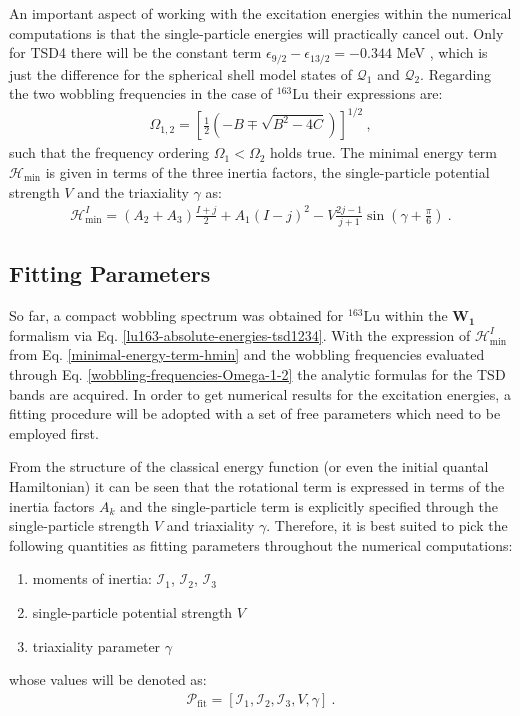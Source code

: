 An important aspect of working with the excitation energies within the numerical computations is that the single-particle energies will practically cancel out. Only for TSD4 there will be the constant term $\epsilon_{9/2}-\epsilon_{13/2}=-0.344$ MeV \cite{raduta2020towards}, which is just the difference for the spherical shell model states of $\mathcal{Q}_1$ and $\mathcal{Q}_2$. Regarding the two wobbling frequencies in the case of $^{163}$Lu their expressions are:
\begin{align}
    \Omega_{1,2}=\left[\frac{1}{2}\left(-B\mp\sqrt{B^2-4C}\right)\right]^{1/2}\ ,
    \label{wobbling-frequencies-Omega-1-2}
\end{align}
such that the frequency ordering $\Omega_1<\Omega_2$ holds true. The minimal energy term $\mathcal{H}_\text{min}$ is given in terms of the three inertia factors, the single-particle potential strength $V$ and the triaxiality $\gamma$ as:
\begin{align}
    \mathcal{H}_\text{min}^I=\left(A_2+A_3\right)\frac{I+j}{2}+A_1(I-j)^2-V\frac{2j-1}{j+1}\sin\left(\gamma+\frac{\pi}{6}\right)\ .
    \label{minimal-energy-term-hmin}
\end{align}

\subsection{Fitting Parameters}

So far, a compact wobbling spectrum was obtained for $^{163}$Lu within the $\mathbf{W_1}$ formalism via Eq. \ref{lu163-absolute-energies-tsd1234}. With the expression of $\mathcal{H}_\text{min}^I$ from Eq. \ref{minimal-energy-term-hmin} and the wobbling frequencies evaluated through Eq. \ref{wobbling-frequencies-Omega-1-2} the analytic formulas for the TSD bands are acquired. In order to get numerical results for the excitation energies, a fitting procedure will be adopted with a set of free parameters which need to be employed first.

From the structure of the classical energy function (or even the initial quantal Hamiltonian) it can be seen that the rotational term is expressed in terms of the inertia factors $A_k$ and the single-particle term is explicitly specified through the single-particle strength $V$ and triaxiality $\gamma$. Therefore, it is best suited to pick the following quantities as fitting parameters throughout the numerical computations:
\begin{enumerate}
    \item moments of inertia: $\mathcal{I}_1$, $\mathcal{I}_2$, $\mathcal{I}_3$
    \item single-particle potential strength $V$
    \item triaxiality parameter $\gamma$
\end{enumerate}
whose values will be denoted as:
\begin{align}
    \mathcal{P}_\text{fit}=\left[\mathcal{I}_1,\mathcal{I}_2,\mathcal{I}_3,V,\gamma\right]\ .
    \label{fitting-parameters-p-fit}
\end{align}

